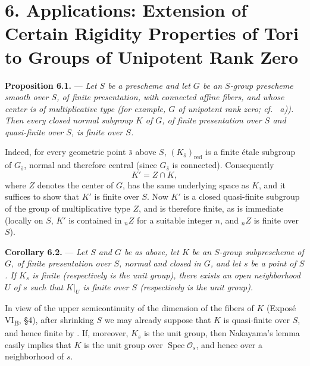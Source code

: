 
%
\section*{6. Applications: Extension of Certain Rigidity Properties
of Tori to Groups of Unipotent Rank Zero}

\noindent{}%
\textbf{Proposition 6.1.} --- \textit{Let \(S\) be a prescheme and
let \(G\) be an \(S\)-group prescheme smooth over \(S\), of finite
presentation, with connected affine fibers, and whose center is of
multiplicative type (for example, \(G\) of unipotent rank zero;
cf.\  a)). Then every closed normal subgroup \(K\) of \(G\),
of finite presentation over \(S\) and quasi-finite over \(S\), is
finite over \(S\).}

\medskip
Indeed, for every geometric point \(\bar s\) above \(S\),
\((K_{\bar s})_{\mathrm{red}}\) is a finite étale subgroup of
\(G_{\bar s}\), normal and therefore central (since \(G_{\bar s}\)
is connected). Consequently
\[
  K'=Z\cap K,
\]
where \(Z\) denotes the center of \(G\), has the same underlying
space as \(K\), and it suffices to show that \(K'\) is finite over
\(S\). Now \(K'\) is a closed quasi-finite subgroup of the group
of multiplicative type \(Z\), and is therefore finite, as is
immediate (locally on \(S\), \(K'\) is contained in \({}_nZ\) for
a suitable integer \(n\), and \({}_nZ\) is finite over \(S\)).

\medskip
\noindent{}%
\textbf{Corollary 6.2.} --- \textit{Let \(S\) and \(G\) be as
above, let \(K\) be an \(S\)-group subprescheme of \(G\), of
finite presentation over \(S\), normal and closed in \(G\), and
let \(s\) be a point of \(S\). If \(K_s\) is finite (respectively
is the unit group), there exists an open neighborhood \(U\) of
\(s\) such that \(K|_U\) is finite over \(S\) (respectively is the
unit group).}

\medskip
In view of the upper semicontinuity of the dimension of the fibers
of \(K\) (Exposé VI\textsubscript{B}, \S4), after shrinking \(S\)
we may already suppose that \(K\) is quasi-finite over \(S\), and
hence finite by . If, moreover, \(K_s\) is the unit group, then
Nakayama's lemma easily implies that \(K\) is the unit group over
\(\operatorname{Spec}\mathcal O_s\), and hence over a neighborhood
of \(s\).

